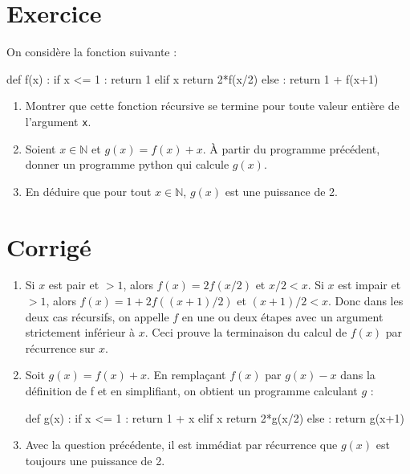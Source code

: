 \section{Exercice}

On considère la fonction suivante :\\
\begin{python}
def f(x) :
    if x <= 1 :
	return 1
    elif x %
	return 2*f(x/2)
    else :
	return 1 + f(x+1)
\end{python}

\begin{enumerate}
\item Montrer que cette fonction récursive se termine pour toute valeur entière 
de l'argument \texttt{x}.
\item Soient $x\in\mathbb N$ et $g(x)=f(x)+x$. À partir du programme précédent, donner 
un programme python qui calcule $g(x)$.
\item En déduire que pour tout $x\in\mathbb N$, $g(x)$ est une puissance de 2.
\end{enumerate}

\ifprof
\section*{Corrigé }

\begin{enumerate}
\item Si $x$ est pair et $> 1$, alors $f (x) = 2f (x/2)$ et $ x/2 < x$. Si $x$ est impair et
 $ > 1$, alors $f (x) = 1 + 2f ((x + 1)/2)$ et $(x + 1)/2 < x$. Donc dans les deux cas
     récursifs, on appelle $f$ en une ou deux étapes avec un argument strictement
     inférieur à $x$. Ceci prouve la terminaison du calcul de $f (x)$ par récurrence
     sur $x$.
\item Soit $g(x) = f (x) + x$. En remplaçant $f (x)$ par $g(x)- x$ dans la définition de
    $ $f et en simplifiant, on obtient un programme calculant $g$ :\\
    
   
\begin{python}
def g(x) :
    if x <= 1 :
	return 1 + x
    elif x %
	return 2*g(x/2)
    else :
	return g(x+1)
\end{python} 

\item Avec la question précédente, il est immédiat par récurrence que $g(x)$ est toujours une puissance de 2.

 \end{enumerate}

